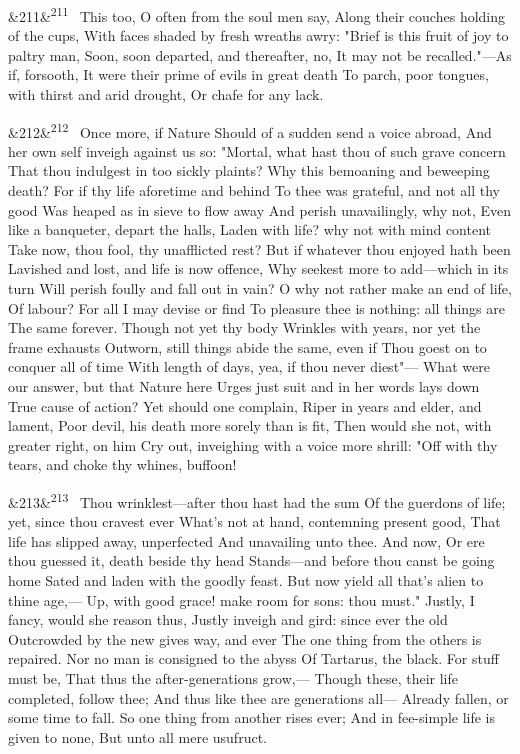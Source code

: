 \documentclass[12pt]{article}
\newcommand{\para}[1][]{\par\noindent\ifx&#1&\else\textsuperscript{\footnotesize #1}~\fi}
\begin{document}
\para[211] This too, O often from the soul men say, Along their couches holding of the cups, With faces shaded by fresh wreaths awry: "Brief is this fruit of joy to paltry man, Soon, soon departed, and thereafter, no, It may not be recalled."---As if, forsooth, It were their prime of evils in great death To parch, poor tongues, with thirst and arid drought, Or chafe for any lack.

\para[212] Once more, if Nature Should of a sudden send a voice abroad, And her own self inveigh against us so: "Mortal, what hast thou of such grave concern That thou indulgest in too sickly plaints? Why this bemoaning and beweeping death? For if thy life aforetime and behind To thee was grateful, and not all thy good Was heaped as in sieve to flow away And perish unavailingly, why not, Even like a banqueter, depart the halls, Laden with life? why not with mind content Take now, thou fool, thy unafflicted rest? But if whatever thou enjoyed hath been Lavished and lost, and life is now offence, Why seekest more to add---which in its turn Will perish foully and fall out in vain? O why not rather make an end of life, Of labour? For all I may devise or find To pleasure thee is nothing: all things are The same forever. Though not yet thy body Wrinkles with years, nor yet the frame exhausts Outworn, still things abide the same, even if Thou goest on to conquer all of time With length of days, yea, if thou never diest"--- What were our answer, but that Nature here Urges just suit and in her words lays down True cause of action? Yet should one complain, Riper in years and elder, and lament, Poor devil, his death more sorely than is fit, Then would she not, with greater right, on him Cry out, inveighing with a voice more shrill: "Off with thy tears, and choke thy whines, buffoon!

\para[213] Thou wrinklest---after thou hast had the sum Of the guerdons of life; yet, since thou cravest ever What's not at hand, contemning present good, That life has slipped away, unperfected And unavailing unto thee. And now, Or ere thou guessed it, death beside thy head Stands---and before thou canst be going home Sated and laden with the goodly feast. But now yield all that's alien to thine age,--- Up, with good grace! make room for sons: thou must." Justly, I fancy, would she reason thus, Justly inveigh and gird: since ever the old Outcrowded by the new gives way, and ever The one thing from the others is repaired. Nor no man is consigned to the abyss Of Tartarus, the black. For stuff must be, That thus the after-generations grow,--- Though these, their life completed, follow thee; And thus like thee are generations all--- Already fallen, or some time to fall. So one thing from another rises ever; And in fee-simple life is given to none, But unto all mere usufruct.
\end{document}
